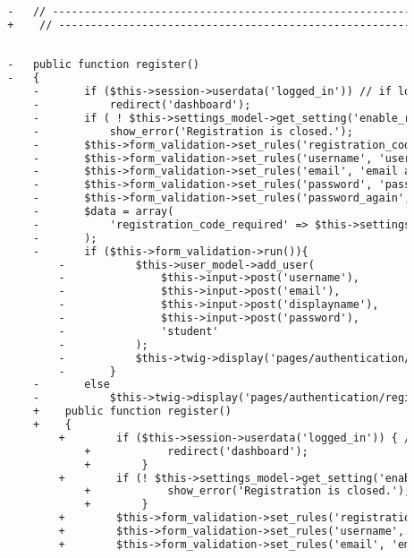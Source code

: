 \begin{lstlisting}[language=diff, caption=Perubahan pada kode Login.php]
		
		-	// ------------------------------------------------------------------------
		+    // ------------------------------------------------------------------------
		
		
		-	public function register()
		-	{
			-		if ($this->session->userdata('logged_in')) // if logged in
			-			redirect('dashboard');
			-		if ( ! $this->settings_model->get_setting('enable_registration'))
			-			show_error('Registration is closed.');
			-		$this->form_validation->set_rules('registration_code', 'registration code', 'callback__registration_code', array('_registration_code' => 'Invalid %s'));
			-		$this->form_validation->set_rules('username', 'username', 'required|min_length[3]|max_length[20]|alpha_numeric|lowercase|is_unique[users.username]', array('is_unique' => 'This %s already exists.'));
			-		$this->form_validation->set_rules('email', 'email address', 'required|max_length[40]|valid_email|lowercase|is_unique[users.email]', array('is_unique' => 'This %s already exists.'));
			-		$this->form_validation->set_rules('password', 'password', 'required|min_length[6]|max_length[200]');
			-		$this->form_validation->set_rules('password_again', 'password confirmation', 'required|matches[password]');
			-		$data = array(
			-			'registration_code_required' => $this->settings_model->get_setting('registration_code')=='0'?FALSE:TRUE
			-		);
			-		if ($this->form_validation->run()){
				-			$this->user_model->add_user(
				-				$this->input->post('username'),
				-				$this->input->post('email'),
				-				$this->input->post('displayname'),
				-				$this->input->post('password'),
				-				'student'
				-			);
				-			$this->twig->display('pages/authentication/register_success.twig');
				-		}
			-		else
			-			$this->twig->display('pages/authentication/register.twig', $data);
			+    public function register()
			+    {
				+        if ($this->session->userdata('logged_in')) { // if logged in
					+            redirect('dashboard');
					+        }
				+        if (! $this->settings_model->get_setting('enable_registration')) {
					+            show_error('Registration is closed.');
					+        }
				+        $this->form_validation->set_rules('registration_code', 'registration code', 'callback__registration_code', array('_registration_code' => 'Invalid %s'));
				+        $this->form_validation->set_rules('username', 'username', 'required|min_length[3]|max_length[20]|alpha_numeric|lowercase|is_unique[users.username]', array('is_unique' => 'This %s already exists.'));
				+        $this->form_validation->set_rules('email', 'email address', 'required|max_length[40]|valid_email|lowercase|is_unique[users.email]', array('is_unique' => 'This %s already exists.'));

\end{lstlisting}
